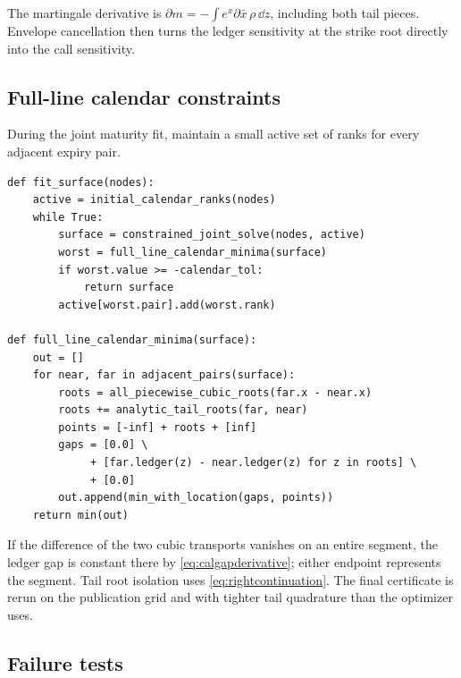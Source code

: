 The martingale derivative is
$\partial m=-\int e^x\partial\bar x\,\rho\,\dd z$, including both tail
pieces.  Envelope cancellation then turns the ledger sensitivity at the
strike root directly into the call sensitivity.

\subsection{Full-line calendar constraints}

During the joint maturity fit, maintain a small active set of ranks for every
adjacent expiry pair.

\begin{lstlisting}[caption={Exchange algorithm for global calendar order.}]
def fit_surface(nodes):
    active = initial_calendar_ranks(nodes)
    while True:
        surface = constrained_joint_solve(nodes, active)
        worst = full_line_calendar_minima(surface)
        if worst.value >= -calendar_tol:
            return surface
        active[worst.pair].add(worst.rank)

def full_line_calendar_minima(surface):
    out = []
    for near, far in adjacent_pairs(surface):
        roots = all_piecewise_cubic_roots(far.x - near.x)
        roots += analytic_tail_roots(far, near)
        points = [-inf] + roots + [inf]
        gaps = [0.0] \
             + [far.ledger(z) - near.ledger(z) for z in roots] \
             + [0.0]
        out.append(min_with_location(gaps, points))
    return min(out)
\end{lstlisting}

If the difference of the two cubic transports vanishes on an entire segment,
the ledger gap is constant there by \eqref{eq:calgapderivative}; either
endpoint represents the segment.  Tail root isolation uses
\eqref{eq:rightcontinuation}.  The final certificate is rerun on the
publication grid and with tighter tail quadrature than the optimizer uses.

\subsection{Failure tests}

